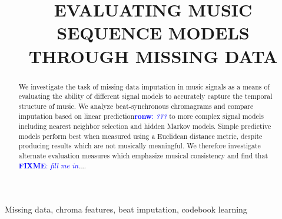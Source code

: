 \documentclass{article}
\title{EVALUATING MUSIC SEQUENCE MODELS THROUGH MISSING DATA}
\newcommand{\FIXME}[2][FIXME]{\textcolor{blue}{\textbf{#1}: \emph{#2}}}
\begin{document}
\ninept
%
\maketitle
%
\begin{abstract}
  We investigate the task of missing data imputation in music signals
  as a means of evaluating the ability of different signal models to
  accurately capture the temporal structure of music.
  We analyze beat-synchronous chromagrams and compare imputation based
  on linear prediction\FIXME[ronw]{???} to more complex signal models
  including nearest neighbor selection and hidden Markov models.
  Simple predictive models perform best when measured using a
  Euclidean distance metric, despite producing results which are not
  musically meaningful.  We therefore investigate alternate evaluation
  measures which emphasize musical consistency and find that
  \FIXME{fill me in}....
%
\end{abstract}
%
\begin{keywords}
Missing data, chroma features, beat imputation, codebook learning
\end{keywords}
%

\end{document}
